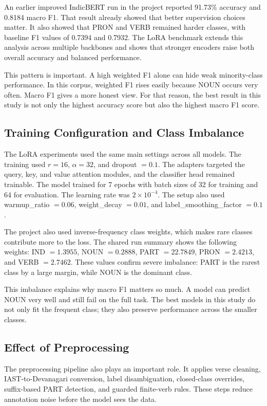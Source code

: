 \documentclass[conference]{IEEEtran}
\begin{document}
An earlier improved IndicBERT run in the project reported 91.73\% accuracy and 0.8184 macro F1. That result already showed that better supervision choices matter. It also showed that PRON and VERB remained harder classes, with baseline F1 values of 0.7394 and 0.7932. The LoRA benchmark extends this analysis across multiple backbones and shows that stronger encoders raise both overall accuracy and balanced performance.

This pattern is important. A high weighted F1 alone can hide weak minority-class performance. In this corpus, weighted F1 rises easily because NOUN occurs very often. Macro F1 gives a more honest view. For that reason, the best result in this study is not only the highest accuracy score but also the highest macro F1 score.

\subsection{Training Configuration and Class Imbalance}
The LoRA experiments used the same main settings across all models. The training used $r=16$, $\alpha=32$, and dropout $=0.1$. The adapters targeted the query, key, and value attention modules, and the classifier head remained trainable. The model trained for 7 epochs with batch sizes of 32 for training and 64 for evaluation. The learning rate was $2\times10^{-4}$. The setup also used warmup\_ratio $=0.06$, weight\_decay $=0.01$, and label\_smoothing\_factor $=0.1$.

The project also used inverse-frequency class weights, which makes rare classes contribute more to the loss. The shared run summary shows the following weights: IND $=1.3955$, NOUN $=0.2888$, PART $=22.7849$, PRON $=2.4213$, and VERB $=2.7462$. These values confirm severe imbalance: PART is the rarest class by a large margin, while NOUN is the dominant class.

This imbalance explains why macro F1 matters so much. A model can predict NOUN very well and still fail on the full task. The best models in this study do not only fit the frequent class; they also preserve performance across the smaller classes.

\subsection{Effect of Preprocessing}
The preprocessing pipeline also plays an important role. It applies verse cleaning, IAST-to-Devanagari conversion, label disambiguation, closed-class overrides, suffix-based PART detection, and guarded finite-verb rules. These steps reduce annotation noise before the model sees the data.
\end{document}
